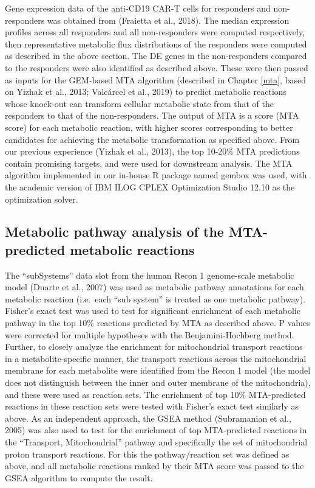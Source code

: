 \documentclass[12pt,twoside,openany,\mydriver]{thesis}  %
\begin{document}
Gene expression data of the anti-CD19 CAR-T cells for responders and non-responders was obtained from (Fraietta et al., 2018). The median expression profiles across all responders and all non-responders were computed respectively, then representative metabolic flux distributions of the responders were computed as described in the above section. The DE genes in the non-responders compared to the responders were also identified as described above. These were then passed as inputs for the GEM-based MTA algorithm (described in Chapter \ref{mta}, based on Yizhak et al., 2013; Valcárcel et al., 2019) to predict metabolic reactions whose knock-out can transform cellular metabolic state from that of the responders to that of the non-responders. The output of MTA is a score (MTA score) for each metabolic reaction, with higher scores corresponding to better candidates for achieving the metabolic transformation as specified above. From our previous experience (Yizhak et al., 2013), the top 10-20\% MTA predictions contain promising targets, and were used for downstream analysis. The MTA algorithm implemented in our in-house R package named gembox was used, with the academic version of IBM ILOG CPLEX Optimization Studio 12.10 as the optimization solver.

\hypertarget{metabolic-pathway-analysis-of-the-mta-predicted-metabolic-reactions}{%
\subsection{Metabolic pathway analysis of the MTA-predicted metabolic reactions}\label{metabolic-pathway-analysis-of-the-mta-predicted-metabolic-reactions}}

The ``subSystems'' data slot from the human Recon 1 genome-scale metabolic model (Duarte et al., 2007) was used as metabolic pathway annotations for each metabolic reaction (i.e.~each ``sub system'' is treated as one metabolic pathway). Fisher's exact test was used to test for significant enrichment of each metabolic pathway in the top 10\% reactions predicted by MTA as described above. P values were corrected for multiple hypotheses with the Benjamini-Hochberg method. Further, to closely analyze the enrichment for mitochondrial transport reactions in a metabolite-specific manner, the transport reactions across the mitochondrial membrane for each metabolite were identified from the Recon 1 model (the model does not distinguish between the inner and outer membrane of the mitochondria), and these were used as reaction sets. The enrichment of top 10\% MTA-predicted reactions in these reaction sets were tested with Fisher's exact test similarly as above. As an independent approach, the GSEA method (Subramanian et al., 2005) was also used to test for the enrichment of top MTA-predicted reactions in the ``Transport, Mitochondrial'' pathway and specifically the set of mitochondrial proton transport reactions. For this the pathway/reaction set was defined as above, and all metabolic reactions ranked by their MTA score was passed to the GSEA algorithm to compute the result.
\end{document}
